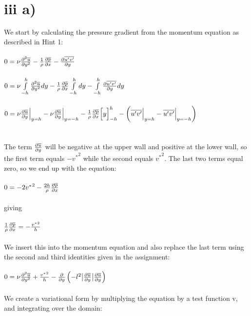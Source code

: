 \documentclass[a4paper,english,11pt,twoside]{article}
\begin{document}
\section*{iii a)}
We start by calculating the pressure gradient from the momentum equation as described in Hint 1:\\
\\
$0 = \nu\frac{\partial^2\overline{u}}{\partial y^2} - \frac{1}{\rho}\frac{\partial\overline{p}}{\partial x} - \frac{\partial\overline{u'v'}}{\partial y}$\\
\\
$0 = \nu\int\limits_{-h}^h\frac{\partial^2\overline{u}}{\partial y^2}dy - \frac{1}{\rho}\frac{\partial\overline{p}}{\partial x}\int\limits_{-h}^hdy - \int\limits_{-h}^h\frac{\partial\overline{u'v'}}{\partial y}dy$\\
\\
$0 = \nu\frac{\partial\overline{u}}{\partial y}\Big|_{y=h} - \nu\frac{\partial\overline{u}}{\partial y}\Big|_{y=-h} - \frac{1}{\rho}\frac{\partial\overline{p}}{\partial x}\Big[y\Big]_{-h}^h - \left(\overline{u'v'}\Big|_{y=h} - \overline{u'v'}\Big|_{y=-h} \right)$\\
\\
\\
The term $\frac{\partial\overline{u}}{\partial y}$ will be negative at the upper wall and positive at the lower wall, so the first term equals $-{v^*}^2$ while the second equals ${v^*}^2$. The last two terms equal zero, so we end up with the equation:\\
\\
$0 = -2{v^*}^2 - \frac{2h}{\rho}\frac{\partial\overline{p}}{\partial x}$\\
\\
giving\\
\\
$\frac{1}{\rho}\frac{\partial\overline{p}}{\partial x} = -\frac{{v^*}^2}{h}$\\
\\
We insert this into the momentum equation and also replace the last term using the second and third identities given in the assignment:\\
\\
$0 = \nu\frac{\partial^2\overline{u}}{\partial y^2} + \frac{{v^*}^2}{h} - \frac{\partial}{\partial y}\left(-l^2\big|\frac{\partial\overline{u}}{\partial y}\big|\frac{\partial\overline{u}}{\partial y} \right)$\\
\\
We create a variational form by multiplying the equation by a test function v, and integrating over the domain:\\
\end{document}
